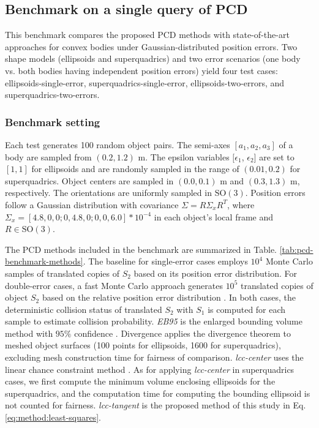 \documentclass[conference]{IEEEtran}
\newcommand{\SO}{\text{SO}}
\begin{document}
\subsection{Benchmark on a single query of PCD}
This benchmark compares the proposed PCD methods with state-of-the-art approaches for convex bodies under Gaussian-distributed position errors. Two shape models (ellipsoids and superquadrics) and two error scenarios (one body vs. both bodies having independent position errors) yield four test cases: ellipsoids-single-error, superquadrics-single-error, ellipsoids-two-errors, and superquadrics-two-errors.


\subsubsection{Benchmark setting}
Each test generates 100 random object pairs. The semi-axes $[a_1, a_2, a_3]$ of a body are sampled from $(0.2,1.2)$ m. The epsilon variables $[\epsilon_1$, $\epsilon_2]$ are set to $[1,1]$ for ellipsoids and are randomly sampled in the range of $(0.01, 0.2)$ for superquadrics. Object centers are sampled in $(0.0, 0.1)$ m and $(0.3, 1.3)$ m, respectively. The orientations are uniformly sampled in $\SO(3)$.  Position errors follow a Gaussian distribution with covariance $\Sigma=R\Sigma_x R^T$, where $\Sigma_x=[4.8,0,0;0,4.8,0;0,0,6.0]*10^{-4}$ in each object’s local frame and $R\in\SO(3)$. 


The PCD methods included in the benchmark are summarized in Table. \ref{tab:pcd-benchmark-methods}. 
The baseline for single-error cases employs $10^4$ Monte Carlo samples of translated copies of $S_2$ based on its position error distribution. For double-error cases, a fast Monte Carlo approach generates $10^5$ translated copies of object $S_2$ based on the relative position error distribution \cite{lambert2008fast}. In both cases, the deterministic collision status of translated $S_2$ with $S_1$ is computed for each sample to estimate collision probability. \textit{EB95} is the enlarged bounding volume method with $95\%$ confidence \cite{dawson2020provably}. 
Divergence \cite{park2020efficient} applies the divergence theorem to meshed object surfaces (100 points for ellipsoids, 1600 for superquadrics), excluding mesh construction time for fairness of comparison.
\textit{lcc-center} uses the linear chance constraint method \cite{zhu2019chance}\cite{liu2023tight}. As for applying \textit{lcc-center} in superquadrics cases, we first compute the minimum volume enclosing ellipsoids for the superquadrics, and the computation time for computing the bounding ellipsoid is not counted for fairness. \textit{lcc-tangent} is the proposed method of this study in Eq. \ref{eq:method:least-squares}. 
\end{document}
